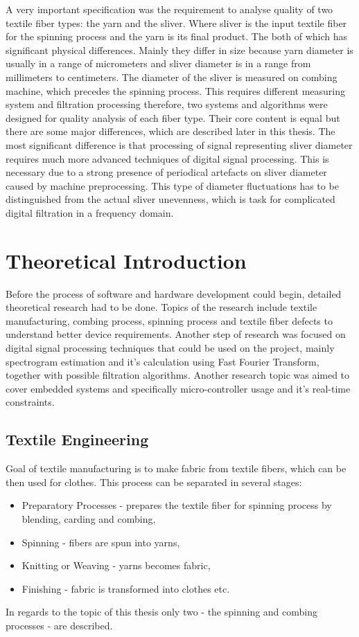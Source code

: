 \documentclass[twoside]{ctuthesis}
\theoremstyle{plain}
\theoremstyle{definition}
\theoremstyle{note}
\begin{document}
A very important specification was the requirement to analyse quality of two textile fiber types: the  yarn and the sliver. Where sliver is the input textile fiber for the spinning process and the yarn is its final product. The both of which has significant physical differences. Mainly they differ in size because yarn diameter is usually in a range of micrometers and sliver diameter is in a range from millimeters to centimeters. The diameter of the sliver is measured on combing machine, which precedes the spinning process. This requires different measuring system and filtration processing therefore, two systems and algorithms were designed for quality analysis of each fiber type. Their core content is equal but there are some major differences, which are described later in this thesis. The most significant difference is that processing of signal representing sliver diameter requires much more advanced techniques of digital signal processing. This is necessary due to a strong presence of periodical artefacts on sliver diameter caused by machine preprocessing. This type of diameter fluctuations has to be distinguished from the actual sliver unevenness, which is task for complicated digital filtration in a frequency domain.

\chapter{Theoretical Introduction}
Before the process of software and hardware development could begin, detailed theoretical research had to be done. Topics of the research include textile manufacturing, combing process, spinning process and textile fiber defects to understand better device requirements. Another step of research was focused on digital signal processing techniques that could be used on the project, mainly spectrogram estimation and it's calculation using Fast Fourier Transform, together with possible filtration algorithms. Another research topic was aimed to cover embedded systems and specifically micro-controller usage and it's real-time constraints.
\section{Textile Engineering}
Goal of textile manufacturing is to make fabric from textile fibers, which can be then used for clothes. This process can be separated in several stages:
\begin{itemize}
	\setlength{\itemsep}{5pt}
\item Preparatory Processes - prepares the textile fiber for spinning process by blending, carding and combing,

\item Spinning - fibers are spun into yarns,

\item Knitting or Weaving - yarns becomes fabric,

\item Finishing - fabric is transformed into clothes etc.
\end{itemize}
In regards to the topic of this thesis only two - the spinning and combing processes - are described.
\end{document}
